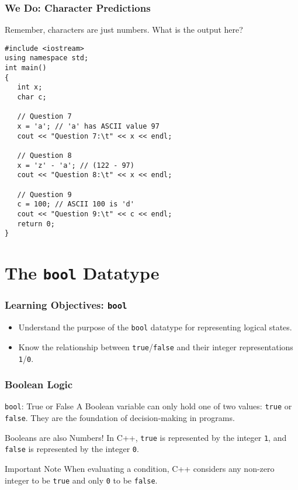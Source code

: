 \documentclass{beamer}
\begin{document}
\begin{frame}[fragile]
\frametitle{We Do: Character Predictions}
Remember, characters are just numbers. What is the output here?
\begin{verbatim}
#include <iostream>
using namespace std;
int main()
{
   int x;
   char c;

   // Question 7
   x = 'a'; // 'a' has ASCII value 97
   cout << "Question 7:\t" << x << endl;

   // Question 8
   x = 'z' - 'a'; // (122 - 97)
   cout << "Question 8:\t" << x << endl;

   // Question 9
   c = 100; // ASCII 100 is 'd'
   cout << "Question 9:\t" << c << endl;
   return 0;
}
\end{verbatim}
\end{frame}

\section{The \texttt{bool} Datatype}

\begin{frame}
\frametitle{Learning Objectives: \texttt{bool}}
\begin{itemize}
    \item Understand the purpose of the \texttt{bool} datatype for representing logical states.
    \item Know the relationship between \texttt{true}/\texttt{false} and their integer representations \texttt{1}/\texttt{0}.
\end{itemize}
\end{frame}

\begin{frame}
\frametitle{Boolean Logic}
\begin{block}{\texttt{bool}: True or False}
A Boolean variable can only hold one of two values: \texttt{true} or \texttt{false}. They are the foundation of decision-making in programs.
\end{block}

\begin{alertblock}{Booleans are also Numbers!}
In C++, \texttt{true} is represented by the integer \texttt{1}, and \texttt{false} is represented by the integer \texttt{0}.
\end{alertblock}

\begin{exampleblock}{Important Note}
When evaluating a condition, C++ considers any non-zero integer to be \texttt{true} and only \texttt{0} to be \texttt{false}.
\end{exampleblock}
\end{frame}
\end{document}

